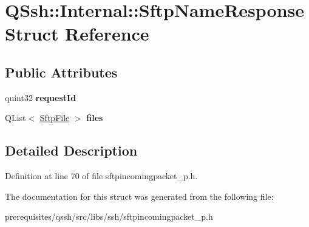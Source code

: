 \hypertarget{struct_q_ssh_1_1_internal_1_1_sftp_name_response}{}\section{Q\+Ssh\+:\+:Internal\+:\+:Sftp\+Name\+Response Struct Reference}
\label{struct_q_ssh_1_1_internal_1_1_sftp_name_response}
\subsection*{Public Attributes}
\begin{DoxyCompactItemize}
\item 
\mbox{\label{struct_q_ssh_1_1_internal_1_1_sftp_name_response_ada1bad2ae30dd7f5c44b8d14b327888b}} 
quint32 {\bfseries request\+Id}
\item 
\mbox{\label{struct_q_ssh_1_1_internal_1_1_sftp_name_response_a2b3aa955357f797581c69d42521b31b6}} 
Q\+List$<$ \mbox{\hyperlink{struct_q_ssh_1_1_internal_1_1_sftp_file}{Sftp\+File}} $>$ {\bfseries files}
\end{DoxyCompactItemize}


\subsection{Detailed Description}


Definition at line 70 of file sftpincomingpacket\+\_\+p.\+h.



The documentation for this struct was generated from the following file\+:\begin{DoxyCompactItemize}
\item 
prerequisites/qssh/src/libs/ssh/sftpincomingpacket\+\_\+p.\+h\end{DoxyCompactItemize}
